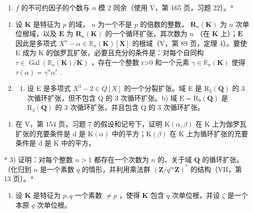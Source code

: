 \begin{enumerate}
\def\labelenumi{(\alph{enumi})}
\setcounter{enumi}{21}
\tightlist
\item
  \(f\) 的不可约因子的个数与 \(n\) 模 2 同余（使用 V，第 165 页，习题 22）。*
\end{enumerate}

\BourbakiExerciseGroup

\begin{enumerate}
\def\labelenumi{\arabic{enumi})}
\item
  设 \(\mathbf{K}\) 是特征为 \(p\) 的域， \(n\) 为一个不是 \(p\) 的倍数的整数， \(\mathbf{R}_n(\mathbf{K})\) 为 \(n\) 次单位根域，以及 \(\mathbf{E}\) 为 \(\mathbf{R}_n(\mathbf{K})\) 的一个循环扩张，其次数为 \(n\) （在 \(\mathbf{K}\) 上）；\(\mathbf{E}\) 因此是多项式 \(X^{n}-\alpha\in\mathbb{R}_{n}(\mathbf{K})[\mathbf{X}]\) 的根域（V，第 89 页，定理 4）。要使 E 成为 K 的伽罗瓦扩张，必要且充分的条件是：对每个自同构 \(\tau\in\operatorname{Gal}\left(\mathbb{R}_{n}(\mathbf{K})/\mathbf{K}\right)\) ，存在一个整数 r\textgreater0 和一个元素 \(\gamma\in\mathbb{R}_{n}(\mathbf{K})\) 使得 \(\tau(\alpha)=\gamma^{n}\alpha^{r}\) .
\item
  \begin{enumerate}
  \def\labelenumii{\alph{enumii})}
  \tightlist
  \item
    设 E 是多项式 \(X^{3}-2\in Q[X]\) 的一个分裂扩张。域 E 是 \(\mathrm{R}_{3}(\mathbf{Q})\) 的 3 次循环扩张，但不包含 Q 的 3 次循环扩张。b) 域 \(\mathrm{E}=\mathrm{R}_{9}(\mathbf{Q})\) 是 \(\mathrm{R}_{3}(\mathbf{Q})\) 的 3 次循环扩张，并且包含 Q 的 3 次循环扩张。
  \end{enumerate}
\end{enumerate}

\begin{enumerate}
\def\labelenumi{\alph{enumi})}
\setcounter{enumi}{2}
\tightlist
\item
  在 V，第 154 页，习题 7 的假设和记号下，证明 \(\mathrm{K}(\alpha,\beta)\) 在 K 上为伽罗瓦扩张的充要条件是 d 是 \(\mathrm{K}(\alpha)\) 中的平方；\(\mathrm{K}(\beta)\) 在 K 上为循环扩张的充要条件是 d 是 K 中的平方。
\end{enumerate}

* 3) 证明：对每个整数 \(n > 1\) 都存在一个次数为 \(n\) 的、关于域 \(\mathbf{Q}\) 的循环扩张。（化归到 \(n\) 是一个素数 \(q\) 的情形，并利用乘法群 \((\mathbf{Z} / q^m\mathbf{Z})^*\) 的结构（VII，第 13 页）。*

\begin{enumerate}
\def\labelenumi{\arabic{enumi})}
\setcounter{enumi}{3}
\tightlist
\item
  设 \(\mathbf{K}\) 是特征为 \(p, q\) 一个素数 \(\neq p\) ，使得 \(\mathbf{K}\) 包含 \(q\) 次单位根，并设 \(\zeta\) 是一个本原 \(q\) 次单位根。
\end{enumerate}

